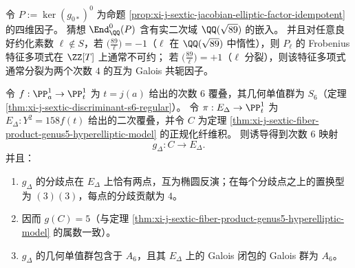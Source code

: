 \begin{conjecture}[四维因子的实乘结构与良好素数处分解型]\label{conj:xi-j-sextic-prym-real-multiplication-sqrt89}
令 \(P:=\ker(g_{0*})^0\) 为命题 \ref{prop:xi-j-sextic-jacobian-elliptic-factor-idempotent} 的四维因子。
猜想 \(\End^0_{\QQ}(P)\) 含有实二次域 \(\QQ(\sqrt{89})\) 的嵌入。
并且对任意良好约化素数 \(\ell\notin S\)，若 \(\bigl(\frac{89}{\ell}\bigr)=-1\)（\(\ell\) 在 \(\QQ(\sqrt{89})\) 中惰性），则 \(P_\ell\) 的 Frobenius 特征多项式在 \(\ZZ[T]\) 上通常不可约；
若 \(\bigl(\frac{89}{\ell}\bigr)=+1\)（\(\ell\) 分裂），则该特征多项式通常分裂为两个次数 \(4\) 的互为 Galois 共轭因子。
\end{conjecture}

\begin{theorem}\label{thm:xi-j-sextic-basechange-compress-s6-to-a6-two-branchpoints}
令 \(f:\PP^1_a\to\PP^1_t\) 为 \(t=j(a)\) 给出的次数 \(6\) 覆叠，其几何单值群为 \(S_6\)（定理 \ref{thm:xi-j-sextic-discriminant-s6-regular}）。
令 \(\pi:E_\Delta\to\PP^1_t\) 为 \(E_\Delta:Y^2=158f(t)\) 给出的二次覆叠，并令 \(C\) 为定理 \ref{thm:xi-j-sextic-fiber-product-genus5-hyperelliptic-model} 的正规化纤维积。
则诱导得到次数 \(6\) 映射
\[
g_\Delta:C\to E_\Delta.
\]
并且：
\begin{enumerate}
  \item \(g_\Delta\) 的分歧点在 \(E_\Delta\) 上恰有两点，互为椭圆反演；在每个分歧点之上的置换型为 \((3)(3)\)，每点的分歧贡献为 \(4\)。
  \item 因而 \(g(C)=5\)（与定理 \ref{thm:xi-j-sextic-fiber-product-genus5-hyperelliptic-model} 的属数一致）。
  \item \(g_\Delta\) 的几何单值群包含于 \(A_6\)，且其 \(E_\Delta\) 上的 Galois 闭包的 Galois 群为 \(A_6\)。
\end{enumerate}
\end{theorem}
